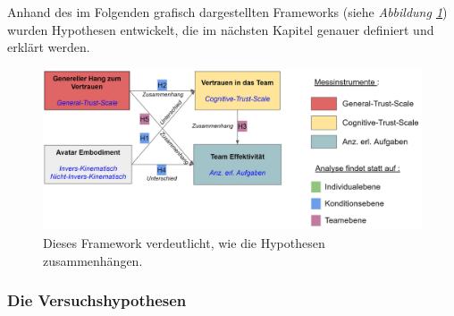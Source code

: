 \documentclass[a4paper,11pt]{article}%
\renewcommand{\\}{\vspace*{0.5\baselineskip} \newline}
\begin{document}
Anhand des im Folgenden grafisch dargestellten Frameworks (siehe \textit{Abbildung \ref{Versuchshypothesen}}) wurden Hypothesen entwickelt, die im nächsten Kapitel genauer definiert und erklärt werden.

\begin{figure}[H]
		\begin{footnotesize}
			\includegraphics[width=\textwidth]{Abbildungen/Versuchshypothesen_02.JPG}		
			\caption[Das Framework der Versuchshypothesen]{Dieses Framework verdeutlicht, wie die Hypothesen zusammenhängen.}
			\label{Versuchshypothesen}
		\end{footnotesize}
	\end{figure}	

\newpage



\subsubsection{Die Versuchshypothesen}
\label{VersuchshypothesenAuflistung}
\end{document}

